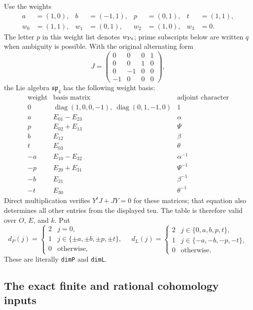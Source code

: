 Use the weights
\[
 \begin{aligned}
 a&=(1,0),& b&=(-1,1),& p&=(0,1),& t&=(1,1),\\
 w_0&=(1,1),& w_1&=(0,1),& w_2&=(1,0),& w_3&=0 .
 \end{aligned}
 \tag{DX.2}
\]
The letter $p$ in this weight list denotes $w_{\rm Ps}$;
prime subscripts below are written $q$ when ambiguity is possible.
With the original alternating form
\[
 J=\begin{pmatrix}
 0&0&0&1\\0&0&1&0\\0&-1&0&0\\-1&0&0&0
 \end{pmatrix},
\]
the Lie algebra $\mathfrak{sp}_4$ has the following weight basis:
\[
\begin{array}{c|c|c}
\text{weight}&\text{basis matrix}&\text{adjoint character}\\ \hline
0&\operatorname{diag}(1,0,0,-1),\
       \operatorname{diag}(0,1,-1,0)&1\\
a&E_{01}-E_{23}&\alpha\\
p&E_{02}+E_{13}&\Psi\\
b&E_{12}&\beta\\
t&E_{03}&\theta\\
-a&E_{10}-E_{32}&\alpha^{-1}\\
-p&E_{20}+E_{31}&\Psi^{-1}\\
-b&E_{21}&\beta^{-1}\\
-t&E_{30}&\theta^{-1}
\end{array}
 \tag{DX.3}
\]
Direct multiplication verifies $Y^tJ+JY=0$ for these matrices;
that equation also determines all other entries from the displayed
ten.  The table is therefore valid over $O$, $E$, and $k$.
Put
\[
 d_P(j)=
 \begin{cases}2&j=0,\\1&j\in\{\pm a,\pm b,\pm p,\pm t\},\\0&\text{otherwise},
 \end{cases}
 \quad
 d_L(j)=
 \begin{cases}2&j\in\{0,a,b,p,t\},\\1&j\in\{-a,-b,-p,-t\},\\0&\text{otherwise}.
 \end{cases}
 \tag{DX.4}
\]
These are literally \texttt{dimP} and \texttt{dimL}.

\subsection{The exact finite and rational cohomology inputs}

